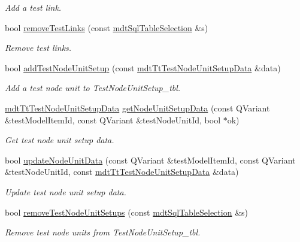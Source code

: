 \begin{DoxyCompactItemize}
\begin{DoxyCompactList}\small\item\em Add a test link. \end{DoxyCompactList}\item 
bool \hyperlink{classmdt_tt_test_model_item_ab9c5c75f887d846e6079841d08a6ec3f}{remove\-Test\-Links} (const \hyperlink{classmdt_sql_table_selection}{mdt\-Sql\-Table\-Selection} \&s)
\begin{DoxyCompactList}\small\item\em Remove test links. \end{DoxyCompactList}\item 
bool \hyperlink{classmdt_tt_test_model_item_aa92543a8bd19b3d5d6f44552901e86d8}{add\-Test\-Node\-Unit\-Setup} (const \hyperlink{classmdt_tt_test_node_unit_setup_data}{mdt\-Tt\-Test\-Node\-Unit\-Setup\-Data} \&data)
\begin{DoxyCompactList}\small\item\em Add a test node unit to Test\-Node\-Unit\-Setup\-\_\-tbl. \end{DoxyCompactList}\item 
\hyperlink{classmdt_tt_test_node_unit_setup_data}{mdt\-Tt\-Test\-Node\-Unit\-Setup\-Data} \hyperlink{classmdt_tt_test_model_item_a5c8ca99e17bc85413f1a10dd669f26c8}{get\-Node\-Unit\-Setup\-Data} (const Q\-Variant \&test\-Model\-Item\-Id, const Q\-Variant \&test\-Node\-Unit\-Id, bool $\ast$ok)
\begin{DoxyCompactList}\small\item\em Get test node unit setup data. \end{DoxyCompactList}\item 
bool \hyperlink{classmdt_tt_test_model_item_af6835a264bcf8b20d9f748cbc4592343}{update\-Node\-Unit\-Data} (const Q\-Variant \&test\-Model\-Item\-Id, const Q\-Variant \&test\-Node\-Unit\-Id, const \hyperlink{classmdt_tt_test_node_unit_setup_data}{mdt\-Tt\-Test\-Node\-Unit\-Setup\-Data} \&data)
\begin{DoxyCompactList}\small\item\em Update test node unit setup data. \end{DoxyCompactList}\item 
bool \hyperlink{classmdt_tt_test_model_item_a20d8f2715f35d5ce8c1fba6179e73a52}{remove\-Test\-Node\-Unit\-Setups} (const \hyperlink{classmdt_sql_table_selection}{mdt\-Sql\-Table\-Selection} \&s)
\begin{DoxyCompactList}\small\item\em Remove test node units from Test\-Node\-Unit\-Setup\-\_\-tbl. \end{DoxyCompactList}\item 

\end{DoxyCompactItemize}
